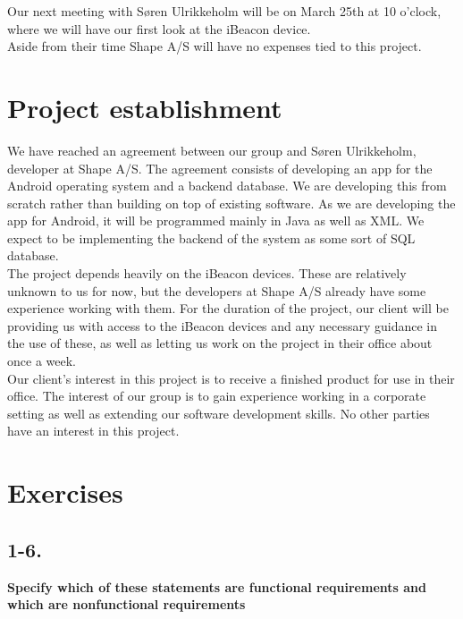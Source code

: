 \documentclass[12pt]{article}
\begin{document}
Our next meeting with S\o ren Ulrikkeholm will be on March 25th at 10 o'clock, where we will have our first look at the iBeacon device.\\

Aside from their time Shape A/S will have no expenses tied to this project.










\section{Project establishment}

We have reached an agreement between our group and S\o ren Ulrikkeholm, developer at Shape A/S. The agreement consists of developing an app for the Android operating system and a backend database. We are developing this from scratch rather than building on top of existing software. As we are developing the app for Android, it will be programmed mainly in Java as well as XML. We expect to be implementing the backend of the system as some sort of SQL database.\\

The project depends heavily on the iBeacon devices. These are relatively unknown to us for now, but the developers at Shape A/S already have some experience working with them. For the duration of the project, our client will be providing us with access to the iBeacon devices and any necessary guidance in the use of these, as well as letting us work on the project in their office about once a week.\\

Our client's interest in this project is to receive a finished product for use in their office. The interest of our group is to gain experience working in a corporate setting as well as extending our software development skills. No other parties have an interest in this project.\\












\newpage
\section{Exercises}
\subsection{1-6.}
\textbf{Specify which of these statements are functional requirements and which are
nonfunctional requirements}
\end{document}
